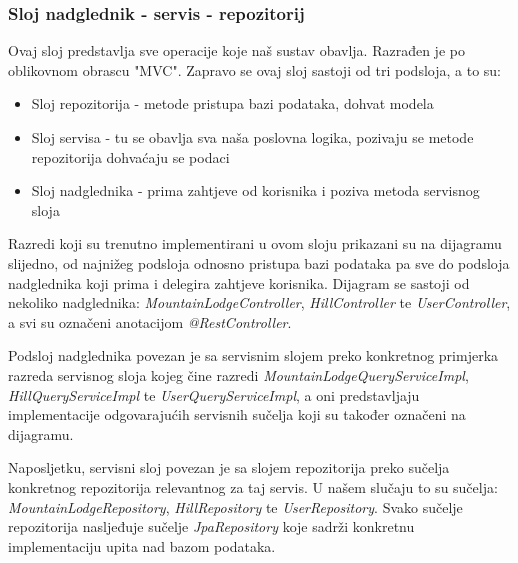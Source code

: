 			\subsubsection{Sloj nadglednik - servis - repozitorij}
			Ovaj sloj predstavlja sve operacije koje naš sustav obavlja. Razrađen je po oblikovnom obrascu "MVC". Zapravo se ovaj sloj sastoji od tri podsloja, a to su: 
			\begin{itemize}
				\item 
					Sloj repozitorija - metode pristupa bazi podataka, dohvat modela
				\item
					Sloj servisa - tu se obavlja sva naša poslovna logika, pozivaju se metode repozitorija dohvaćaju se podaci
				\item Sloj nadglednika - prima zahtjeve od korisnika i poziva metoda servisnog sloja	
			\end{itemize}
			Razredi koji su trenutno implementirani u ovom sloju prikazani su na dijagramu slijedno, od najnižeg podsloja odnosno pristupa bazi podataka pa sve do podsloja nadglednika koji prima i delegira zahtjeve korisnika.
			Dijagram se sastoji od nekoliko nadglednika: \textit{MountainLodgeController}, \textit{HillController} te \textit{UserController}, a svi su označeni anotacijom \textit{@RestController}. 
			
			Podsloj nadglednika povezan je sa servisnim slojem preko konkretnog primjerka razreda servisnog sloja kojeg čine razredi \textit{MountainLodgeQueryServiceImpl}, \textit{HillQueryServiceImpl} te \textit{UserQueryServiceImpl}, a oni predstavljaju implementacije odgovarajućih servisnih sučelja koji su također označeni na dijagramu.
			
			 Naposljetku, servisni sloj povezan je sa slojem repozitorija preko sučelja konkretnog repozitorija relevantnog za taj servis. U našem slučaju to su sučelja: \textit{MountainLodgeRepository}, \textit{HillRepository} te \textit{UserRepository}. Svako sučelje repozitorija nasljeđuje sučelje \textit{JpaRepository} koje sadrži konkretnu implementaciju upita nad bazom podataka.
			 

